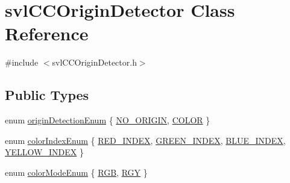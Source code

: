 \hypertarget{classsvl_c_c_origin_detector}{}\section{svl\+C\+C\+Origin\+Detector Class Reference}
\label{classsvl_c_c_origin_detector}


{\ttfamily \#include $<$svl\+C\+C\+Origin\+Detector.\+h$>$}

\subsection*{Public Types}
\begin{DoxyCompactItemize}
\item 
enum \hyperlink{classsvl_c_c_origin_detector_a829919c0137fee858082813a13e4f1c9}{origin\+Detection\+Enum} \{ \hyperlink{classsvl_c_c_origin_detector_a829919c0137fee858082813a13e4f1c9a5220f69dc8766b2177ce9ab496d9de63}{N\+O\+\_\+\+O\+R\+I\+G\+I\+N}, 
\hyperlink{classsvl_c_c_origin_detector_a829919c0137fee858082813a13e4f1c9a6fde1af1e5eeec03d469cec2b080475e}{C\+O\+L\+O\+R}
 \}
\item 
enum \hyperlink{classsvl_c_c_origin_detector_a1e4dabe83f94a0b1b889ecf59b3c86e5}{color\+Index\+Enum} \{ \hyperlink{classsvl_c_c_origin_detector_a1e4dabe83f94a0b1b889ecf59b3c86e5aaed058a0c0019238f8348aa1de10402d}{R\+E\+D\+\_\+\+I\+N\+D\+E\+X}, 
\hyperlink{classsvl_c_c_origin_detector_a1e4dabe83f94a0b1b889ecf59b3c86e5a3b46564a343cde474a62d50161f7f2ac}{G\+R\+E\+E\+N\+\_\+\+I\+N\+D\+E\+X}, 
\hyperlink{classsvl_c_c_origin_detector_a1e4dabe83f94a0b1b889ecf59b3c86e5a48b2b34325cf4da5422b6b94c9cf2664}{B\+L\+U\+E\+\_\+\+I\+N\+D\+E\+X}, 
\hyperlink{classsvl_c_c_origin_detector_a1e4dabe83f94a0b1b889ecf59b3c86e5a53b8ba560b7d7695a23a1e9395fae7fa}{Y\+E\+L\+L\+O\+W\+\_\+\+I\+N\+D\+E\+X}
 \}
\item 
enum \hyperlink{classsvl_c_c_origin_detector_abc46027473187db71ca84294e3df9554}{color\+Mode\+Enum} \{ \hyperlink{classsvl_c_c_origin_detector_abc46027473187db71ca84294e3df9554a6776e828a188248094522bf3420db2d2}{R\+G\+B}, 
\hyperlink{classsvl_c_c_origin_detector_abc46027473187db71ca84294e3df9554a9cf1aba344d3244ebdbb4de099f3c181}{R\+G\+Y}
 \}
\end{DoxyCompactItemize}
